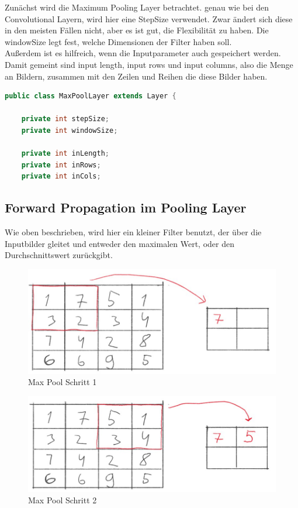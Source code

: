 \documentclass[12pt]{article}
\begin{document}
Zunächst wird die Maximum Pooling Layer betrachtet.
genau wie bei den Convolutional Layern, wird hier eine StepSize verwendet. Zwar ändert sich diese in den meisten Fällen nicht, aber es ist gut, die Flexibilität zu haben.
Die windowSize legt fest, welche Dimensionen der Filter haben soll.
\\Außerdem ist es hilfreich, wenn die Inputparameter auch gespeichert werden. Damit gemeint sind input length, input rows und input columns, also die Menge an Bildern, zusammen mit den Zeilen und Reihen die diese Bilder haben.

\begin{lstlisting}[language=Java]
public class MaxPoolLayer extends Layer {

    private int stepSize;
    private int windowSize;

    private int inLength;
    private int inRows;
    private int inCols;
\end{lstlisting} 

\subsection{Forward Propagation im Pooling Layer}
Wie oben beschrieben, wird hier ein kleiner Filter benutzt, der über die Inputbilder gleitet und entweder den maximalen Wert, oder den Durchschnittswert zurückgibt. 

\begin{figure}[htp]
\centering
\includegraphics[scale=0.40]{Images/008_MaxPool1.jpg}
\caption{Max Pool Schritt  1}
\label{Max Pool Schritt  1}
\end{figure}

\begin{figure}[htp]
\centering
\includegraphics[scale=0.40]{Images/009_MaxPool2.jpg}
\caption{Max Pool Schritt 2}
\label{Max Pool Schritt  2}
\end{figure}
\end{document}
